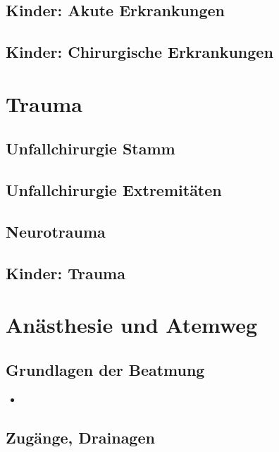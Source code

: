 \clearpage
\section{Kinder: Akute Erkrankungen}

\clearpage
\section{Kinder: Chirurgische Erkrankungen}

\chapter{Trauma}

\clearpage
\section{Unfallchirurgie Stamm}

\clearpage
\section{Unfallchirurgie Extremitäten}

\clearpage
\section{Neurotrauma}

\clearpage
\section{Kinder: Trauma}

\chapter{Anästhesie und Atemweg}

\clearpage
\section{Grundlagen der Beatmung}

{%

}
{%
\begin{itemize}
  \item
\end{itemize}
}



\section{Zugänge, Drainagen} 
